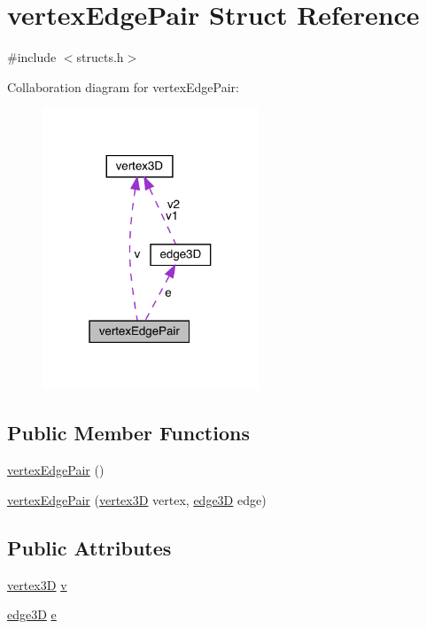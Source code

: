 \hypertarget{structvertex_edge_pair}{}\section{vertex\+Edge\+Pair Struct Reference}
\label{structvertex_edge_pair}


{\ttfamily \#include $<$structs.\+h$>$}



Collaboration diagram for vertex\+Edge\+Pair\+:
\nopagebreak
\begin{figure}[H]
\begin{center}
\leavevmode
\includegraphics[width=183pt]{structvertex_edge_pair__coll__graph}
\end{center}
\end{figure}
\subsection*{Public Member Functions}
\begin{DoxyCompactItemize}
\item 
\mbox{\hyperlink{structvertex_edge_pair_a8186fec8ce5239705015fe738152a986}{vertex\+Edge\+Pair}} ()
\item 
\mbox{\hyperlink{structvertex_edge_pair_a845d184b645d35be5223420014fa63e8}{vertex\+Edge\+Pair}} (\mbox{\hyperlink{structvertex3_d}{vertex3D}} vertex, \mbox{\hyperlink{structedge3_d}{edge3D}} edge)
\end{DoxyCompactItemize}
\subsection*{Public Attributes}
\begin{DoxyCompactItemize}
\item 
\mbox{\hyperlink{structvertex3_d}{vertex3D}} \mbox{\hyperlink{structvertex_edge_pair_a44bec46a69035f12fc7181da5d06008a}{v}}
\item 
\mbox{\hyperlink{structedge3_d}{edge3D}} \mbox{\hyperlink{structvertex_edge_pair_a3409c245aff2d5d804d1d37c12a78d63}{e}}
\end{DoxyCompactItemize}


